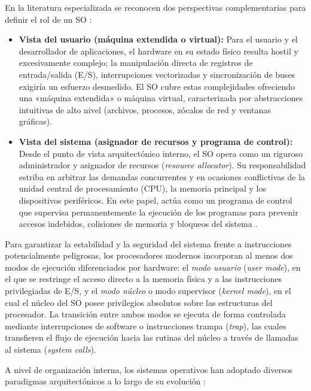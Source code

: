 \documentclass[12pt]{article}
\begin{document}
En la literatura especializada se reconocen dos perspectivas complementarias para definir el rol de un SO \parencite[\S 1.1, p.\ 4]{silberschatz2006fundamentos}:
\begin{itemize}[leftmargin=*]
    \item \textbf{Vista del usuario (máquina extendida o virtual):} Para el usuario y el desarrollador de aplicaciones, el hardware en su estado físico resulta hostil y excesivamente complejo; la manipulación directa de registros de entrada/salida (E/S), interrupciones vectorizadas y sincronización de buses exigiría un esfuerzo desmedido. El SO cubre estas complejidades ofreciendo una «máquina extendida» o máquina virtual, caracterizada por abstracciones intuitivas de alto nivel (archivos, procesos, zócalos de red y ventanas gráficas).
    \item \textbf{Vista del sistema (asignador de recursos y programa de control):} Desde el punto de vista arquitectónico interno, el SO opera como un riguroso administrador y asignador de recursos (\textit{resource allocator}). Su responsabilidad estriba en arbitrar las demandas concurrentes y en ocasiones conflictivas de la unidad central de procesamiento (CPU), la memoria principal y los dispositivos periféricos. En este papel, actúa como un programa de control que supervisa permanentemente la ejecución de los programas para prevenir accesos indebidos, colisiones de memoria y bloqueos del sistema \parencite[\S 1.3, p.\ 7]{deitel2004operating}.
\end{itemize}

Para garantizar la estabilidad y la seguridad del sistema frente a instrucciones potencialmente peligrosas, los procesadores modernos incorporan al menos dos modos de ejecución diferenciados por hardware: el \textit{modo usuario} (\textit{user mode}), en el que se restringe el acceso directo a la memoria física y a las instrucciones privilegiadas de E/S, y el \textit{modo núcleo} o modo supervisor (\textit{kernel mode}), en el cual el núcleo del SO posee privilegios absolutos sobre las estructuras del procesador. La transición entre ambos modos se ejecuta de forma controlada mediante interrupciones de software o instrucciones trampa (\textit{trap}), las cuales transfieren el flujo de ejecución hacia las rutinas del núcleo a través de llamadas al sistema (\textit{system calls}).

A nivel de organización interna, los sistemas operativos han adoptado diversos paradigmas arquitectónicos a lo largo de su evolución \parencite[\S 1.13, p.\ 28]{deitel2004operating}:
\end{document}
